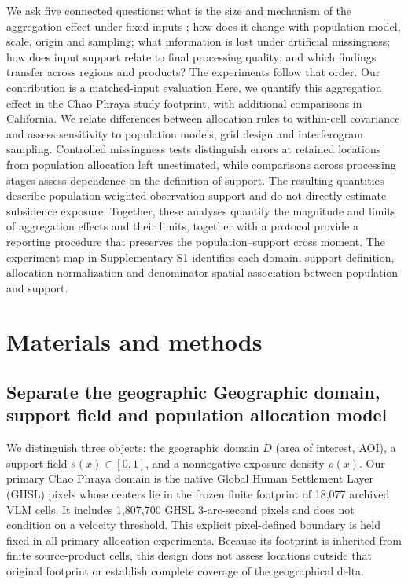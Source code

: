 \documentclass[pdflatex,sn-nature]{sn-jnl}
\providecommand{\DIFadd}[1]{{\protect\color{blue} \sf #1}} %
\providecommand{\DIFdel}[1]{{\protect\color{red} \scriptsize #1}} %
\providecommand{\DIFaddbegin}{} %
\providecommand{\DIFaddend}{} %
\providecommand{\DIFdelbegin}{} %
\providecommand{\DIFdelend}{} %
\begin{document}
\DIFdelbegin \DIFdel{We ask five connected questions: what is the size and mechanism of the aggregation effect under fixed inputs ; how does it change with population model, scale, origin and sampling; what information is lost under artificial missingness; how does input support relate to final processing quality; and which findings transfer across regions and products? The experiments follow that order. Our contribution is a matched-input evaluation }\DIFdelend \DIFaddbegin \DIFadd{Here, we quantify this aggregation effect in the Chao Phraya study footprint, with additional comparisons in California. We relate differences between allocation rules to within-cell covariance and assess sensitivity to population models, grid design and interferogram sampling. Controlled missingness tests distinguish errors at retained locations from population allocation left unestimated, while comparisons across processing stages assess dependence on the definition of support. The resulting quantities describe population-weighted observation support and do not directly estimate subsidence exposure. Together, these analyses quantify the magnitude and limits }\DIFaddend of aggregation effects and \DIFdelbegin \DIFdel{their limits, together with a protocol }\DIFdelend \DIFaddbegin \DIFadd{provide a reporting procedure }\DIFaddend that preserves the \DIFdelbegin \DIFdel{population--support cross moment. The experiment map in Supplementary S1 identifies each domain, support definition, allocation normalization and denominator}\DIFdelend \DIFaddbegin \DIFadd{spatial association between population and support}\DIFaddend .

\section{Materials and methods}
\subsection{\DIFdelbegin \DIFdel{Separate the geographic }\DIFdelend \DIFaddbegin \DIFadd{Geographic }\DIFaddend domain, support field and \DIFaddbegin \DIFadd{population }\DIFaddend allocation\DIFdelbegin \DIFdel{model}\DIFdelend }
We distinguish three objects: the geographic domain $D$ (area of interest, AOI), a support field $s(x)\in[0,1]$, and a nonnegative exposure density $\rho(x)$. Our primary Chao Phraya domain is the native Global Human Settlement Layer (GHSL) pixels whose centers lie in the frozen finite footprint of 18,077 archived VLM cells. It includes 1,807,700 GHSL 3-arc-second pixels and does not condition on a velocity threshold. This explicit pixel-defined boundary is held fixed in all primary allocation experiments. Because its footprint is inherited from finite source-product cells, this design does not assess locations outside that original footprint or establish complete coverage of the geographical delta.
\end{document}
